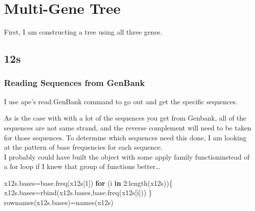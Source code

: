 \documentclass[
]{article}
\newenvironment{Shaded}{\begin{snugshade}}{\end{snugshade}}
\newcommand{\ControlFlowTok}[1]{\textcolor[rgb]{0.13,0.29,0.53}{\textbf{#1}}}
\newcommand{\DecValTok}[1]{\textcolor[rgb]{0.00,0.00,0.81}{#1}}
\newcommand{\FunctionTok}[1]{\textcolor[rgb]{0.00,0.00,0.00}{#1}}
\newcommand{\NormalTok}[1]{#1}
\newcommand{\OtherTok}[1]{\textcolor[rgb]{0.56,0.35,0.01}{#1}}
\newcommand{\SpecialCharTok}[1]{\textcolor[rgb]{0.00,0.00,0.00}{#1}}
\newcommand{\StringTok}[1]{\textcolor[rgb]{0.31,0.60,0.02}{#1}}
\begin{document}
\hypertarget{multi-gene-tree}{%
\section{Multi-Gene Tree}\label{multi-gene-tree}}

First, I am constructing a tree using all three genes.

\hypertarget{s}{%
\subsection{12s}\label{s}}

\hypertarget{reading-sequences-from-genbank}{%
\subsubsection{Reading Sequences from
GenBank}\label{reading-sequences-from-genbank}}

I use ape's read.GenBank command to go out and get the specific
sequences.

\begin{Shaded}
\end{Shaded}

As is the case with with a lot of the sequences you get from Genbank,
all of the sequences are not same strand, and the reverse complement
will need to be taken for those sequences. To determine which sequences
need this done, I am looking at the pattern of base frequencies for each
sequence.\\
I probably could have built the object with some apply family
functioninstead of a for loop if I knew that group of functions
better\ldots{}

\begin{Shaded}
\begin{Highlighting}[]
\NormalTok{x12s.bases}\OtherTok{=}\FunctionTok{base.freq}\NormalTok{(x12s[}\DecValTok{1}\NormalTok{])}
\ControlFlowTok{for}\NormalTok{ (i }\ControlFlowTok{in} \DecValTok{2}\SpecialCharTok{:}\FunctionTok{length}\NormalTok{(x12s))\{}
\NormalTok{  x12s.bases}\OtherTok{=}\FunctionTok{rbind}\NormalTok{(x12s.bases,}\FunctionTok{base.freq}\NormalTok{(x12s[i]))  }
\NormalTok{\}}
\FunctionTok{rownames}\NormalTok{(x12s.bases)}\OtherTok{=}\FunctionTok{names}\NormalTok{(x12s)}
\end{Highlighting}
\end{Shaded}
\end{document}
